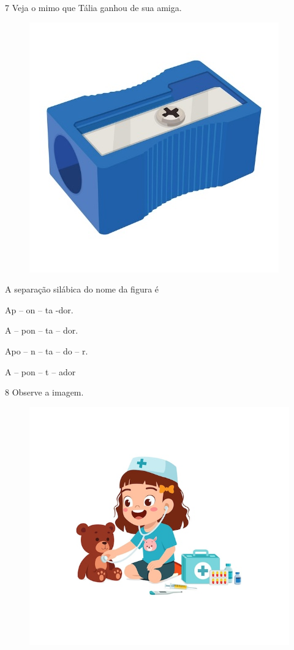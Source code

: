 \num{7} Veja o mimo que Tália ganhou de sua amiga.

\begin{figure}[htpb!]
\centering
\includegraphics[width=.5\textwidth]{media/image168.jpeg}
\end{figure}


A separação silábica do nome da figura é

\begin{escolha}
\item Ap -- on -- ta -dor.

\item A -- pon -- ta -- dor.

\item Apo -- n -- ta -- do -- r.

\item A -- pon -- t -- ador
\end{escolha}

\num{8} Observe a imagem.

\begin{figure}[htpb!]
\centering
\includegraphics[width=.5\textwidth]{media/image169.jpeg}
\end{figure}

